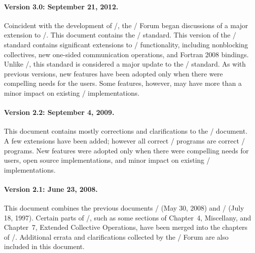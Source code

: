 %
\paragraph*{Version 3.0:  September 21, 2012.}
Coincident with the development of \mpiiidotii/, the \MPI/ Forum began
discussions of a major extension to \MPI/.  This document contains the
\MPIIII/ standard.  This version of the \mpiiii/ standard
contains significant extensions to \MPI/ functionality, including
nonblocking collectives, new one-sided communication operations, and
Fortran 2008 bindings.  Unlike \mpiiidotii/, this standard is
considered a major update to the \MPI/ standard.  As with previous
versions, new features have been adopted only when there were
compelling needs for the users.  Some features, however, may have more
than a minor impact on existing \MPI/ implementations.

\paragraph*{Version 2.2:  September 4, 2009.}
This document contains mostly corrections and clarifications to the
\mpiiidoti/ document.  A few extensions have been added; however all
correct \mpiiidoti/ programs are correct
\mpiiidotii/ programs.  New features
were adopted only when there were compelling needs for users, open
source implementations, and minor impact on existing \MPI/
implementations.  

\paragraph*{Version 2.1: June 23, 2008.}
This document combines the previous documents 
\mpiidotiii/ (May 30, 2008) 
and \mpiiidoto/ (July 18, 1997). 
Certain parts of \mpiiidoto/, such as some sections of Chapter~4, 
Miscellany, and Chapter~7, Extended Collective
Operations, have  
been merged into the chapters of \mpiidotiii/. Additional errata and 
clarifications collected by the \mpi/ Forum are also included in 
this document.

